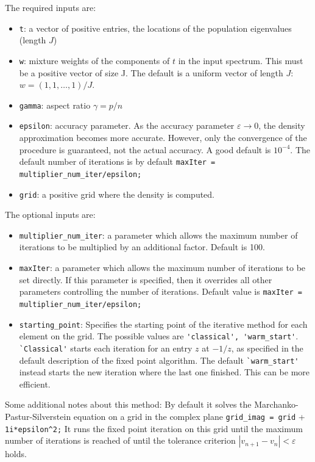 \documentclass[english,11pt]{article} %
\begin{document}
 The required inputs are: 
\begin{itemize}
\item \verb+t+:  a vector of positive entries, the locations of the population eigenvalues (length $J$)
\item \verb+w+: mixture weights of the components of $t$ in the input spectrum. This must be a positive vector of size J. The default is a uniform vector of length $J$: $w = (1,1,\ldots,1)/J$.
\item \verb+gamma+:  aspect ratio $\gamma = p/n$
\item \verb+epsilon+: accuracy parameter. As the accuracy parameter $\varepsilon \to 0$, the density approximation becomes more accurate. However, only the convergence of the procedure is guaranteed, not the actual accuracy. A good default is $10^{-4}$. The default number of iterations is by default \verb+maxIter = multiplier_num_iter/epsilon;+
\item \verb+grid+: a positive grid where the density is computed. 
\end{itemize}

 The optional inputs are: 
 
\begin{itemize}
\item \verb+multiplier_num_iter+: a parameter which allows the maximum number of iterations to be multiplied by an additional factor. Default is 100.
\item \verb+maxIter+: a parameter which allows the maximum number of iterations to be set directly. If this parameter is specified, then it overrides all other parameters controlling the number of iterations.  Default value is \verb+maxIter = multiplier_num_iter/epsilon;+
\item \verb+starting_point+: Specifies the starting point of the iterative method for each element on the grid. The possible values are \verb+'classical', 'warm_start'+. \verb+`Classical'+ starts each iteration for an entry $z$ at $-1/z$, as specified in the default description of the fixed point algorithm. The default \verb+`warm_start'+ instead starts the new iteration where the last one finished. This can be more efficient.
\end{itemize} 
 
Some additional notes about this method: By default it solves the Marchanko-Pastur-Silverstein equation on a grid in the complex plane \verb+grid_imag = grid+ + \verb+  1i*epsilon^2;+ It runs the fixed point iteration on this grid until the maximum number of iterations is reached of until the tolerance criterion $|v_{n+1}-v_n|<\varepsilon$ holds. 
\end{document}
